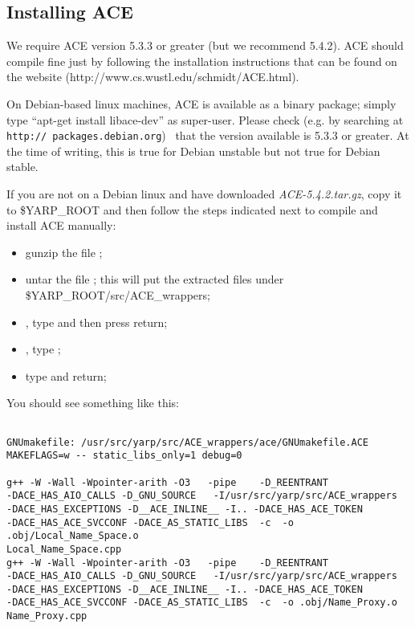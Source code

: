 \subsection{Installing ACE}
We require ACE version 5.3.3 or greater (but we recommend 5.4.2). ACE should compile fine just by following the installation instructions that can be found on the website (http://www.cs.wustl.edu/schmidt/ACE.html). 

On Debian-based linux machines, ACE is available as a binary package; simply type ``apt-get install libace-dev'' as super-user.  Please check (e.g. by searching at {\tt http:// packages.debian.org}) ~that the version available is 5.3.3 or greater.  At the time of writing, this is true for Debian unstable but not true for Debian stable.

If you are not on a Debian linux and have downloaded {\em ACE-5.4.2.tar.gz}, copy it to \$YARP\_ROOT and then follow the steps indicated next to compile and install ACE manually:
\begin{itemize}
\item gunzip the file ;
\item untar the file ; this will put the extracted files under \$YARP\_ROOT/src/ACE\_wrappers;
\item {}, type  and then press return;
\item {}, type ;
\item type  and return;
\end{itemize}

You should see something like this:
\begin{verbatim}

GNUmakefile: /usr/src/yarp/src/ACE_wrappers/ace/GNUmakefile.ACE 
MAKEFLAGS=w -- static_libs_only=1 debug=0

g++ -W -Wall -Wpointer-arith -O3   -pipe    -D_REENTRANT 
-DACE_HAS_AIO_CALLS -D_GNU_SOURCE   -I/usr/src/yarp/src/ACE_wrappers 
-DACE_HAS_EXCEPTIONS -D__ACE_INLINE__ -I.. -DACE_HAS_ACE_TOKEN 
-DACE_HAS_ACE_SVCCONF -DACE_AS_STATIC_LIBS  -c  -o .obj/Local_Name_Space.o
Local_Name_Space.cpp
g++ -W -Wall -Wpointer-arith -O3   -pipe    -D_REENTRANT 
-DACE_HAS_AIO_CALLS -D_GNU_SOURCE   -I/usr/src/yarp/src/ACE_wrappers 
-DACE_HAS_EXCEPTIONS -D__ACE_INLINE__ -I.. -DACE_HAS_ACE_TOKEN 
-DACE_HAS_ACE_SVCCONF -DACE_AS_STATIC_LIBS  -c  -o .obj/Name_Proxy.o 
Name_Proxy.cpp

\end{verbatim}


